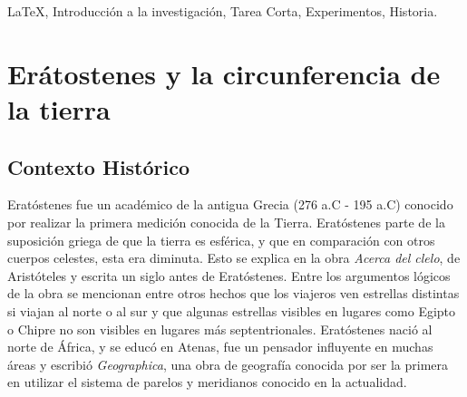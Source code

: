 \documentclass[journal]{IEEEtran}
\begin{document}







\maketitle



\begin{IEEEkeywords}
\LaTeX\xspace , Introducción a la investigación, Tarea Corta, Experimentos, Historia.
\end{IEEEkeywords}






%
\IEEEpeerreviewmaketitle



\section{Erátostenes y la circunferencia de la tierra}
\subsection{Contexto Histórico}
Eratóstenes fue un académico de la antigua Grecia (276 a.C - 195 a.C) conocido por realizar la primera medición conocida
de la Tierra. Eratóstenes parte de la suposición griega de que la tierra es esférica,
y que en comparación con otros cuerpos celestes,
esta era diminuta. Esto se explica en la obra \emph{Acerca del clelo},
de Aristóteles y escrita un siglo antes de Eratóstenes.
Entre los argumentos lógicos de la obra se mencionan entre otros hechos que los viajeros ven 
estrellas distintas si viajan al norte o al sur y que algunas estrellas visibles en lugares como Egipto o Chipre no son visibles en lugares más 
septentrionales.
Eratóstenes nació al norte de África, y se educó en Atenas, fue un pensador influyente en muchas áreas y escribió \emph{Geographica}, una obra de 
geografía conocida por ser la primera en utilizar el sistema de parelos y meridianos conocido en la actualidad.
\end{document}
